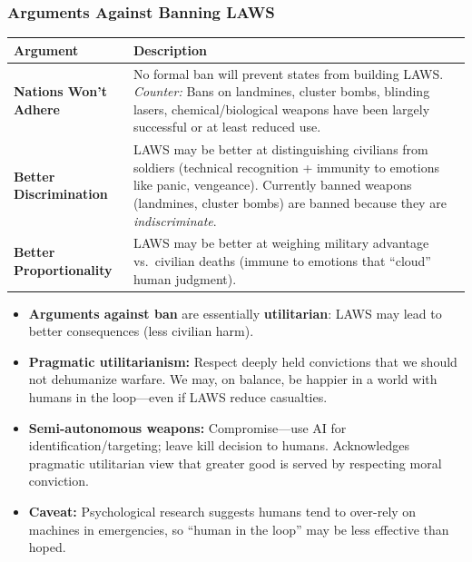 \subsubsection{Arguments Against Banning LAWS}

\begin{center}
\renewcommand{\arraystretch}{1.3}
\begin{tabular}{@{} l p{8.5cm} @{}}
\toprule
\textbf{Argument} & \textbf{Description} \\
\midrule
\textbf{Nations Won't Adhere} & No formal ban will prevent states from building LAWS. \textit{Counter:} Bans on landmines, cluster bombs, blinding lasers, chemical/biological weapons have been largely successful or at least reduced use. \\
\textbf{Better Discrimination} & LAWS may be better at distinguishing civilians from soldiers (technical recognition + immunity to emotions like panic, vengeance). Currently banned weapons (landmines, cluster bombs) are banned because they are \textit{indiscriminate}. \\
\textbf{Better Proportionality} & LAWS may be better at weighing military advantage vs.\ civilian deaths (immune to emotions that ``cloud'' human judgment). \\
\bottomrule
\end{tabular}
\end{center}

\begin{thmbox}
\begin{itemize}
  \item \textbf{Arguments against ban} are essentially \textbf{utilitarian}: LAWS may lead to better consequences (less civilian harm).
  \item \textbf{Pragmatic utilitarianism:} Respect deeply held convictions that we should not dehumanize warfare. We may, on balance, be happier in a world with humans in the loop---even if LAWS reduce casualties.
  \item \textbf{Semi-autonomous weapons:} Compromise---use AI for identification/targeting; leave kill decision to humans. Acknowledges pragmatic utilitarian view that greater good is served by respecting moral conviction.
  \item \textbf{Caveat:} Psychological research suggests humans tend to over-rely on machines in emergencies, so ``human in the loop'' may be less effective than hoped.
\end{itemize}
\end{thmbox}

